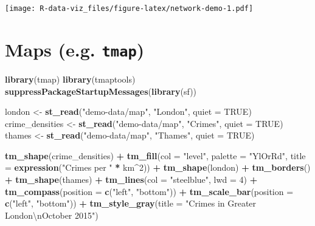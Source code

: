\documentclass[]{book}
\newenvironment{Shaded}{\begin{snugshade}}{\end{snugshade}}
\newcommand{\KeywordTok}[1]{\textcolor[rgb]{0.13,0.29,0.53}{\textbf{#1}}}
\newcommand{\DataTypeTok}[1]{\textcolor[rgb]{0.13,0.29,0.53}{#1}}
\newcommand{\DecValTok}[1]{\textcolor[rgb]{0.00,0.00,0.81}{#1}}
\newcommand{\CharTok}[1]{\textcolor[rgb]{0.31,0.60,0.02}{#1}}
\newcommand{\StringTok}[1]{\textcolor[rgb]{0.31,0.60,0.02}{#1}}
\newcommand{\OtherTok}[1]{\textcolor[rgb]{0.56,0.35,0.01}{#1}}
\newcommand{\OperatorTok}[1]{\textcolor[rgb]{0.81,0.36,0.00}{\textbf{#1}}}
\newcommand{\NormalTok}[1]{#1}
\theoremstyle{definition}
\theoremstyle{definition}
\theoremstyle{definition}
\theoremstyle{remark}
\begin{document}
\texttt{[image: R-data-viz\_files/figure-latex/network-demo-1.pdf]}

\section{\texorpdfstring{Maps (e.g.
\textbf{\texttt{tmap}})}{Maps (e.g. tmap)}}\label{maps-e.g.-tmap}

\begin{Shaded}
\begin{Highlighting}[]
\KeywordTok{library}\NormalTok{(tmap)}
\KeywordTok{library}\NormalTok{(tmaptools)}
\KeywordTok{suppressPackageStartupMessages}\NormalTok{(}\KeywordTok{library}\NormalTok{(sf))}

\NormalTok{london <-}\StringTok{ }\KeywordTok{st_read}\NormalTok{(}\StringTok{"demo-data/map"}\NormalTok{, }\StringTok{"London"}\NormalTok{, }\DataTypeTok{quiet =} \OtherTok{TRUE}\NormalTok{)}
\NormalTok{crime_densities <-}\StringTok{ }\KeywordTok{st_read}\NormalTok{(}\StringTok{"demo-data/map"}\NormalTok{, }\StringTok{"Crimes"}\NormalTok{, }\DataTypeTok{quiet =} \OtherTok{TRUE}\NormalTok{)}
\NormalTok{thames <-}\StringTok{ }\KeywordTok{st_read}\NormalTok{(}\StringTok{"demo-data/map"}\NormalTok{, }\StringTok{"Thames"}\NormalTok{, }\DataTypeTok{quiet =} \OtherTok{TRUE}\NormalTok{)}

\KeywordTok{tm_shape}\NormalTok{(crime_densities) }\OperatorTok{+}
\StringTok{  }\KeywordTok{tm_fill}\NormalTok{(}\DataTypeTok{col =} \StringTok{"level"}\NormalTok{, }\DataTypeTok{palette =} \StringTok{"YlOrRd"}\NormalTok{, }
    \DataTypeTok{title =} \KeywordTok{expression}\NormalTok{(}\StringTok{"Crimes per "} \OperatorTok{*}\StringTok{ }\NormalTok{km}\OperatorTok{^}\DecValTok{2}\NormalTok{)) }\OperatorTok{+}\StringTok{ }
\KeywordTok{tm_shape}\NormalTok{(london) }\OperatorTok{+}\StringTok{ }\KeywordTok{tm_borders}\NormalTok{() }\OperatorTok{+}
\KeywordTok{tm_shape}\NormalTok{(thames) }\OperatorTok{+}\StringTok{ }\KeywordTok{tm_lines}\NormalTok{(}\DataTypeTok{col =} \StringTok{"steelblue"}\NormalTok{, }\DataTypeTok{lwd =} \DecValTok{4}\NormalTok{) }\OperatorTok{+}
\KeywordTok{tm_compass}\NormalTok{(}\DataTypeTok{position =} \KeywordTok{c}\NormalTok{(}\StringTok{"left"}\NormalTok{, }\StringTok{"bottom"}\NormalTok{)) }\OperatorTok{+}
\KeywordTok{tm_scale_bar}\NormalTok{(}\DataTypeTok{position =} \KeywordTok{c}\NormalTok{(}\StringTok{"left"}\NormalTok{, }\StringTok{"bottom"}\NormalTok{)) }\OperatorTok{+}\StringTok{ }
\KeywordTok{tm_style_gray}\NormalTok{(}\DataTypeTok{title =} \StringTok{"Crimes in Greater London}\CharTok{\textbackslash{}n}\StringTok{October 2015"}\NormalTok{)}
\end{Highlighting}
\end{Shaded}
\end{document}
